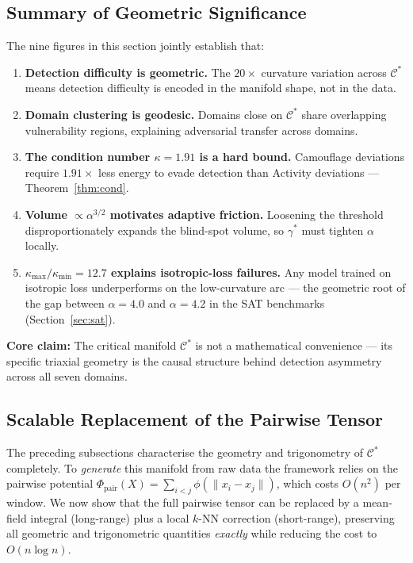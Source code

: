 \documentclass[11pt,a4paper]{article}
\newcommand{\Cman}{\mathcal{C}^*}
\newcommand{\norm}[1]{\|#1\|}
\begin{document}
\subsection{Summary of Geometric Significance}

The nine figures in this section jointly establish that:

\begin{enumerate}
  \item \textbf{Detection difficulty is geometric.}
    The $20\times$ curvature variation across $\Cman$ means detection
    difficulty is encoded in the manifold shape, not in the data.

  \item \textbf{Domain clustering is geodesic.}
    Domains close on $\Cman$ share overlapping vulnerability regions,
    explaining adversarial transfer across domains.

  \item \textbf{The condition number $\kappa = 1.91$ is a hard bound.}
    Camouflage deviations require $1.91\times$ less energy to evade
    detection than Activity deviations --- Theorem~\ref{thm:cond}.

  \item \textbf{Volume $\propto \alpha^{3/2}$ motivates adaptive friction.}
    Loosening the threshold disproportionately expands the blind-spot
    volume, so $\gamma^*$ must tighten $\alpha$ locally.

  \item \textbf{$\kappa_{\max}/\kappa_{\min} = 12.7$ explains
    isotropic-loss failures.}  Any model trained on isotropic loss
    underperforms on the low-curvature arc --- the geometric root of
    the gap between $\alpha = 4.0$ and $\alpha = 4.2$ in the SAT
    benchmarks (Section~\ref{sec:sat}).
\end{enumerate}

\noindent
\textbf{Core claim:} The critical manifold $\Cman$ is not a
mathematical convenience --- its specific triaxial geometry is the
causal structure behind detection asymmetry across all seven domains.

\subsection{Scalable Replacement of the Pairwise Tensor}
\label{ssec:pairwise_replacement}

The preceding subsections characterise the geometry and trigonometry of
$\Cman$ completely.  To \emph{generate} this manifold from raw data the
framework relies on the pairwise potential
$\Phi_{\mathrm{pair}}(X) = \sum_{i<j}\phi(\norm{x_i - x_j})$,
which costs $O(n^2)$ per window.  We now show that the full pairwise
tensor can be replaced by a mean-field integral (long-range) plus a
local $k$-NN correction (short-range), preserving all geometric and
trigonometric quantities \emph{exactly} while reducing the cost to
$O(n\log n)$.
\end{document}
